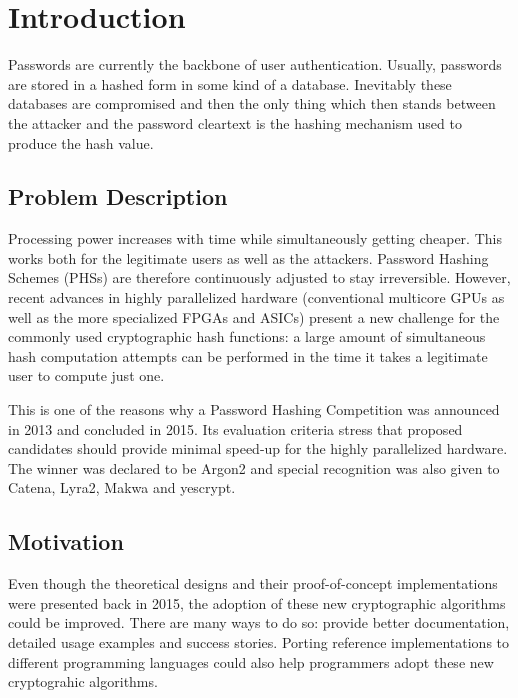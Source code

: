 \chapter{Introduction}
\label{sec:introduction}
Passwords are currently the backbone of user authentication. Usually, passwords are stored in a hashed form in some kind of a database. Inevitably these databases are compromised and then the only thing which then stands between the attacker and the password cleartext is the hashing mechanism used to produce the hash value.

\section{Problem Description}
Processing power increases with time while simultaneously getting cheaper. This works both for the legitimate users as well as the attackers. Password Hashing Schemes (PHSs) are therefore continuously adjusted to stay irreversible. However, recent advances in highly parallelized hardware (conventional multicore GPUs as well as the more specialized FPGAs and ASICs) present a new challenge for the commonly used cryptographic hash functions: a large amount of simultaneous hash computation attempts can be performed in the time it takes a legitimate user to compute just one.

This is one of the reasons why a Password Hashing Competition was announced in 2013 and concluded in 2015. Its evaluation criteria stress that proposed candidates should provide minimal speed-up for the highly parallelized hardware. The winner was declared to be Argon2 and special recognition was also given to Catena, Lyra2, Makwa and yescrypt.

\section{Motivation}
Even though the theoretical designs and their proof-of-concept implementations were presented back in 2015, the adoption of these new cryptographic algorithms could be improved. There are many ways to do so: provide better documentation, detailed usage examples and success stories. Porting reference implementations to different programming languages could also help programmers adopt these new cryptograhic algorithms.

